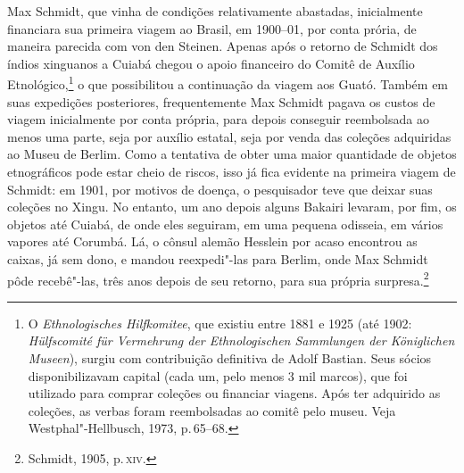 Max Schmidt, que vinha de condições relativamente abastadas,
inicialmente financiara sua primeira viagem ao Brasil, em 1900--01, por
conta prória, de maneira parecida com von den Steinen. Apenas após o
retorno de Schmidt dos índios xinguanos a Cuiabá chegou o apoio
financeiro do Comitê de Auxílio Etnológico,\footnote{O \textit{Ethnologisches Hilfkomitee}, que existiu
  entre 1881 e 1925 (até 1902: \textit{Hülfscomité für Vermehrung der
  Ethnologischen Sammlungen der Königlichen Museen}), surgiu
  com contribuição definitiva de Adolf Bastian. Seus sócios
  disponibilizavam capital (cada um, pelo menos 3 mil marcos), que foi
  utilizado para comprar coleções ou financiar viagens. Após ter
  adquirido as coleções, as verbas foram reembolsadas ao comitê pelo
  museu. Veja Westphal"-Hellbusch, 1973, p.\,65--68.} o que possibilitou a
continuação da viagem aos Guató. Também em suas expedições posteriores,
frequentemente Max Schmidt pagava os custos de viagem inicialmente por
conta própria, para depois conseguir reembolsada ao menos uma parte,
seja por auxílio estatal, seja por venda das coleções adquiridas ao
Museu de Berlim. Como a tentativa de obter uma maior quantidade de
objetos etnográficos pode estar cheio de riscos, isso já fica evidente
na primeira viagem de Schmidt: em 1901, por motivos de doença, o
pesquisador teve que deixar suas coleções no Xingu. No entanto, um ano
depois alguns Bakairi levaram, por fim, os objetos até Cuiabá, de onde
eles seguiram, em uma pequena odisseia, em vários vapores até Corumbá.
Lá, o cônsul alemão Hesslein por acaso encontrou as caixas, já sem dono,
e mandou reexpedi"-las para Berlim, onde Max Schmidt pôde recebê"-las,
três anos depois de seu retorno, para sua própria surpresa.\footnote{Schmidt,
1905, p.\,\textsc{xiv}.}


